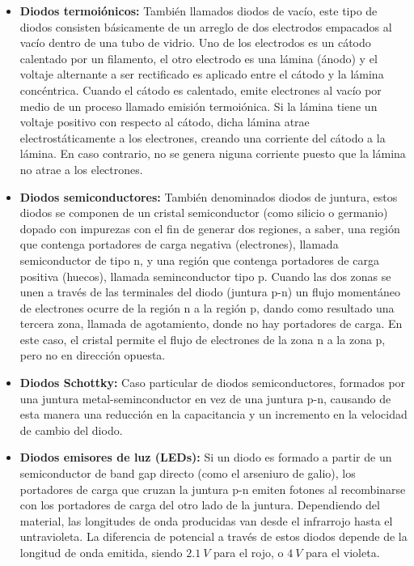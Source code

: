 \documentclass{scrartcl}
\begin{document}
\begin{itemize}
	\item \textbf{Diodos termoiónicos:} También llamados diodos de vacío, este tipo de diodos consisten básicamente de un arreglo de dos electrodos empacados al vacío dentro de una tubo de vidrio. Uno de los electrodos es un cátodo calentado por un filamento, el otro electrodo es una lámina (ánodo) y el voltaje alternante a ser rectificado es aplicado entre el cátodo y la lámina concéntrica. Cuando el cátodo es calentado, emite electrones al vacío por medio de un proceso llamado emisión termoiónica. Si la lámina tiene un voltaje positivo con respecto al cátodo, dicha lámina atrae electrostáticamente a los electrones, creando una corriente del cátodo a la lámina. En caso contrario, no se genera niguna corriente puesto que la lámina no atrae a los electrones.
	
	\item \textbf{Diodos semiconductores:} También denominados diodos de juntura, estos diodos se componen de un cristal semiconductor (como silicio o germanio) dopado con impurezas con el fin de generar dos regiones, a saber, una región que contenga portadores de carga negativa (electrones), llamada semiconductor de tipo n, y una región que contenga portadores de carga positiva (huecos), llamada seminconductor tipo p. Cuando las dos zonas se unen a través de las terminales del diodo (juntura p-n) un flujo momentáneo de electrones ocurre de la región n a la región p, dando como resultado una tercera zona, llamada de agotamiento, donde no hay portadores de carga. En este caso, el cristal permite el flujo de electrones de la zona n a la zona p, pero no en dirección opuesta.
	
	\item \textbf{Diodos Schottky:} Caso particular de diodos semiconductores, formados por una juntura metal-seminconductor en vez de una juntura p-n, causando de esta manera una reducción en la capacitancia y un incremento en la velocidad de cambio del diodo.
	
	\item \textbf{Diodos emisores de luz (LEDs):} Si un diodo es formado a partir de un semiconductor de band gap directo (como el arseniuro de galio), los portadores de carga que cruzan la juntura p-n emiten fotones al recombinarse con los portadores de carga del otro lado de la juntura. Dependiendo del material, las longitudes de onda producidas van desde el infrarrojo hasta el untravioleta. La diferencia de potencial a través de estos diodos depende de la longitud de onda emitida, siendo $2.1\ V$ para el rojo, o $4\ V$ para el violeta. 


\end{itemize}
\end{document}
